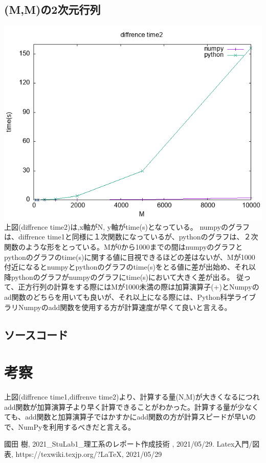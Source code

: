 \documentclass[a4paper, 11pt, titlepage]{jsarticle}
\begin{document}
\subsection{(M,M)の2次元行列}
\includegraphics[width=15cm]{data2.png}
\\上図(diffrence time2)は,x軸がN, y軸がtime(s)となっている。
numpyのグラフは、diffrence time1と同様に１次関数になっているが、pythonのグラフは、２次関数のような形をとっている。Mが0から1000までの間はnumpyのグラフとpythonのグラフのtime(s)に関する値に目視できるほどの差はないが、Mが1000付近になるとnumpyとpythonのグラフのtime(s)をとる値に差が出始め、それ以降pythonのグラフがnumpyのグラフにtime(s)において大きく差が出る。
従って、正方行列の計算をする際にはMが1000未満の際は加算演算子(+)とNumpyのad関数のどちらを用いても良いが、それ以上になる際には、Python科学ライブラリNumpyのadd関数を使用する方が計算速度が早くて良いと言える。
\clearpage
\subsection{ソースコード}


\section{考察}
上図(diffrence time1,diffrenve time2)より、計算する量(N,M)が大きくなるにつれadd関数が加算演算子より早く計算できることがわかった。計算する量が少なくても、add関数と加算演算子ではかすかにadd関数の方が計算スピードが早いので、NumPyを利用するべきだと言える。
\begin{thebibliography}{99}
 國田 樹, 2021\_StuLab1\_理工系のレポート作成技術 , 2021/05/29.
 Latex入門/図表, https://texwiki.texjp.org/?LaTeX, 2021/05/29
\end{thebibliography}
\end{document}
